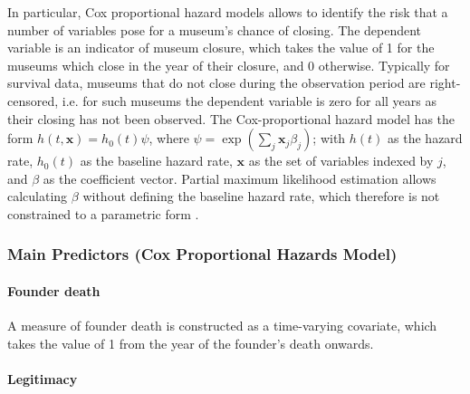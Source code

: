 \documentclass[12pt]{article}
\begin{document}
In particular, Cox proportional hazard models allows to identify the risk that a number of variables pose for a museum's chance of closing. 
The dependent variable is an indicator of museum closure, which takes the value of 1 for the museums which close in the year of their closure, and 0 otherwise.
Typically for survival data, museums that do not close during the observation period are right-censored, i.e. for such museums the dependent variable is zero for all years as their closing has not been observed.
The Cox-proportional hazard model has the form \(h(t,\mathbf{x}) = h_0(t) \psi\), where \(\psi = \exp(\sum_{j} \mathbf{x}_j \beta_j)\); with \(h(t)\) as the hazard rate, \(h_0(t)\) as the baseline hazard rate, \(\mathbf{x}\) as the set of variables indexed by \(j\), and \(\beta\) as the coefficient vector.
Partial maximum likelihood estimation allows calculating \(\beta\) without defining the baseline hazard rate, which therefore is not constrained to a parametric form \parencite{Moore_2015_survival}.
\subsubsection*{Main Predictors (Cox Proportional Hazards Model)}


\paragraph*{Founder death}

A measure of founder death is constructed as a time-varying covariate, which takes the value of 1 from the year of the founder's death onwards.
\paragraph*{Legitimacy}
\end{document}
